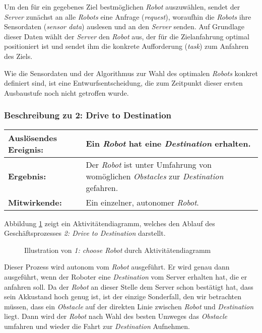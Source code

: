 \documentclass[includeheaders]{scrartcl}
\begin{document}
			Um den für ein gegebenes Ziel bestmöglichen \emph{Robot} auszuwählen, sendet
			der \emph{Server} zunächst an alle \emph{Robots} eine Anfrage (\emph{request}),
			woraufhin die \emph{Robots} ihre Sensordaten (\emph{sensor data}) auslesen und
			an den \emph{Server} senden. Auf Grundlage dieser Daten wählt der \emph{Server} den
			\emph{Robot} aus, der für die Zielanfahrung optimal positioniert ist und
			sendet ihm die konkrete Aufforderung (\emph{task}) zum Anfahren des
			Ziels.

			Wie die Sensordaten und der Algorithmus zur Wahl des optimalen \emph{Robots}
			konkret definiert sind, ist eine Entwurfsentscheidung, die zum Zeitpunkt
			dieser ersten Ausbaustufe noch nicht getroffen wurde.

			\subsubsection*{Beschreibung zu 2: Drive to Destination}

			\begin{table}[H]
				\centering
				\begin{tabularx}{\textwidth}{@{}p{3cm}X@{}}
				\toprule
				\textbf{Auslösendes Ereignis:} & Ein \emph{Robot} hat eine \emph{Destination} erhalten.\\ \midrule
				\textbf{Ergebnis:} & Der \emph{Robot} ist unter Umfahrung von womöglichen \emph{Obstacles} zur \emph{Destination} gefahren.\\ \midrule
				\textbf{Mitwirkende:} &	Ein einzelner, autonomer \emph{Robot}. \\
				\bottomrule
				\end{tabularx}
				\label{tab:2-4-drive-to-destination}
			\end{table}

			Abbildung \ref{fig:2-4-drive-to-destination-aktivitaetendiagramm} zeigt ein Aktivitätendiagramm, welches den Ablauf des Geschäftsprozesses \emph{2: Drive to Destination} darstellt.

			\begin{figure}[H]
				\centering
				\caption{Illustration von \emph{1: choose Robot} durch Aktivitätendiagramm}
				\label{fig:2-4-drive-to-destination-aktivitaetendiagramm}
			\end{figure}

			Dieser Prozess wird autonom vom \emph{Robot} ausgeführt. Er wird genau
			dann ausgeführt, wenn der Roboter eine \emph{Destination} vom Server
			erhalten hat, die er anfahren soll. Da der \emph{Robot} an dieser Stelle
			dem Server schon bestätigt hat, dass sein Akkustand hoch genug ist, ist
			der einzige Sonderfall, den wir betrachten müssen, dass ein
			\emph{Obstacle} auf der direkten Linie zwischen \emph{Robot} und
			\emph{Destination} liegt. Dann wird der \emph{Robot} nach Wahl des
			besten Umweges das \emph{Obstacle} umfahren und wieder die Fahrt zur
			\emph{Destination} Aufnehmen.
\end{document}
